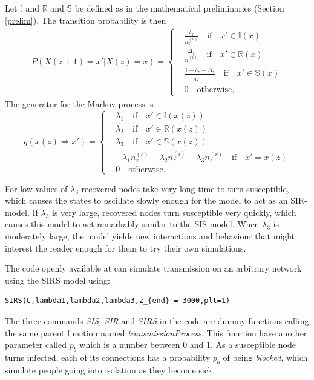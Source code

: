 \documentclass[12pt]{article} %
\numberwithin{equation}{section}
\begin{document}
Let $\mathbb{I}$ and $\mathbb{R}$ and $\mathbb{S}$ be defined as in the mathematical preliminaries (Section \ref{prelim}). The transition probability is then
\begin{equation} \label{firstPSIRS}
\begin{split}
P(X(z+1) = x' |X(z)= x) =
\begin{cases}
& \frac{\delta_z}{n_z^{(c)}}  \quad \text{if} \quad x' \in \mathbb{I}(x) \\
& \frac{\Delta_z}{n_z^{(i)}}  \quad \text{if} \quad x' \in \mathbb{R}(x) \\
& \frac{1-\delta_z-\Delta_z}{n_z^{(r)}}  \quad \text{if} \quad x' \in \mathbb{S}(x) \\
& 0 \quad \text{otherwise,}
\end{cases}
\end{split}
\end{equation}
The generator for the Markov process is
\begin{equation}\label{qSIRS}
    q(x(z)\Rightarrow x') = 
    \begin{cases}
    & \lambda_1 \quad \text{if} \quad x' \in \mathbb{I}(x(z)) \\
    & \lambda_2 \quad \text{if} \quad x' \in \mathbb{R}(x(z)) \\
    & \lambda_3 \quad \text{if} \quad x' \in \mathbb{S}(x(z)) \\
    & -\lambda_1n_z^{(c)}-\lambda_2n_z^{(i)}-\lambda_3n_z^{(r)}   \quad \text{if} \quad x' = x(z)\\
    & 0 \quad \text{otherwise.}
    \end{cases}
\end{equation}

For low values of $\lambda_3$ recovered nodes take very long time to turn susceptible, which causes the states to oscillate slowly enough for the model to act as an SIR-model. If $\lambda_3$ is very large, recovered nodes turn susceptible very quickly, which causes this model to act remarkably similar to the SIS-model. When $\lambda_3$ is moderately large, the model yields new interactions and behaviour that might interest the reader enough for them to try their own simulations.

The code openly available at \cite{github} can simulate transmission on an arbitrary network using the SIRS model using:

\begin{verbatim}
SIRS(C,lambda1,lambda2,lambda3,z_{end} = 3000,plt=1)
\end{verbatim}

The three commands \textit{SIS, SIR} and \textit{SIRS} in the code are dummy functions calling the same parent function named \textit{transmissionProcess}. This function have another parameter called $p_b$ which is a number between 0 and 1. As a susceptible node turns infected, each of its connections has a probability $p_b$ of being \textit{blocked}, which simulate people going into isolation as they become sick.

%
%
\printbibliography %
\end{document}
